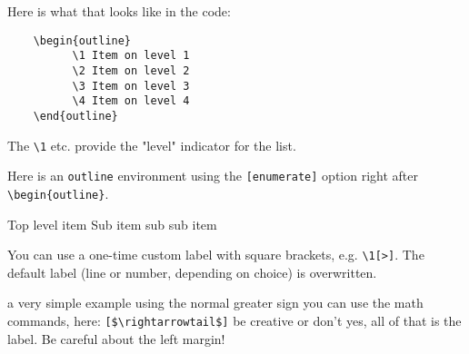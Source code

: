     Here is what that looks like in the code:

    \begin{verbatim}
    \begin{outline}
          \1 Item on level 1
          \2 Item on level 2
          \3 Item on level 3
          \4 Item on level 4
    \end{outline}
    \end{verbatim}

    The \verb|\1| etc. provide the "level" indicator for the list.

    Here is an \verb|outline| environment using the \verb|[enumerate]| option right after\\ \verb|\begin{outline}|.

    \begin{outline}[enumerate]
        \1 Top level item
         \2 Sub item
          \3 sub sub item
    \end{outline}

    You can use a one-time custom label with square brackets, e.g. \verb|\1[>]|. The default label (line or number, depending on choice) is overwritten.

    \begin{outline}
        \1[>] a very simple example using the normal greater sign
        \2[$\rightarrowtail$] you can use the math commands, here: \verb|[$\rightarrowtail$]|
        \2[\LaTeX] be creative
        \2[$\cdot$] or don't
         yes, all of that is the label. Be careful about the left margin!
    \end{outline}

